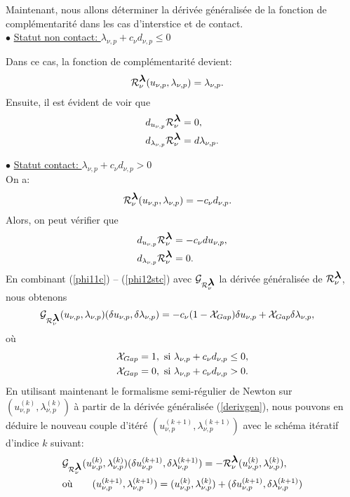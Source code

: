 Maintenant, nous allons déterminer la dérivée généralisée de la fonction de complémentarité dans les cas d'interstice et de contact.\\

$\bullet$ \underline{Statut non contact: $\lambda_{\nu, p}+c_{\nu}d_{\nu,p}\le 0$}

\noindent Dans ce cas, la fonction de complémentarité devient:
\begin{align*}
&{\cal R}_{\nu}^{\mbox{\boldmath{$\lambda$}}}(u_{\nu, p},\lambda_{\nu, p})=\lambda_{\nu, p}.
\end{align*}
Ensuite, il est évident de voir que
\begin{align}
&d_{u_{\nu, p}} {\cal R}_{\nu}^{\mbox{\boldmath{$\lambda$}}}=0\label{phi11c},\\
&d_{\lambda_{\nu, p}} {\cal R}_{\nu}^{\mbox{\boldmath{$\lambda$}}}=d{\lambda_{\nu, p}}\label{phi12c}.
\end{align}

$\bullet$ \underline{Statut contact: $\lambda_{\nu, 
p}+c_{\nu}d_{\nu,p}> 0$}\\
\noindent On a:
\begin{align*}
&{\cal R}_{\nu}^{\mbox{\boldmath{$\lambda$}}}(u_{\nu, p},\lambda_{\nu, p})=-c_{\nu}d_{\nu,p}.
\end{align*}
Alors, on peut vérifier que
\begin{align}
&d_{u_{\nu, p}} {\cal R}_{\nu}^{\mbox{\boldmath{$\lambda$}}}=-c_{\nu}d{u_{\nu, p}}\label{phi11stc},\\
&d_{\lambda_{\nu, p}} {\cal R}_{\nu}^{\mbox{\boldmath{$\lambda$}}}=0\label{phi12stc}.
\end{align}
\noindent En combinant (\ref{phi11c}) -- (\ref{phi12stc}) avec ${\cal G}_{{\cal R}_{\nu}^{\mbox{\boldmath{$\lambda$}}}}$ la dérivée généralisée de ${\cal R}_{\nu}^{\mbox{\boldmath{$\lambda$}}}$, nous obtenons
\begin{align}
&{\cal G}_{{\cal R}_{\nu}^{\mbox{\boldmath{$\lambda$}}}}(u_{\nu, p},\lambda_{\nu, p})(\delta u_{\nu, p},\delta\lambda_{\nu, p})= -c_{\nu}(1-{\cal X}_{Gap})\delta u_{\nu, p} + {\cal X}_{Gap} \delta\lambda_{\nu, p},\label{derivgen}
\end{align}
où 
\begin{align*}
&{\cal X}_{Gap} =1, \ {\rm si}\ \lambda_{\nu, p}+c_{\nu}d_{\nu,p}\le 0,\\
&{\cal X}_{Gap} =0,  \ {\rm si}\ \lambda_{\nu, p}+c_{\nu}d_{\nu,p}> 0.
\end{align*}
En utilisant maintenant le formalisme semi-régulier de Newton sur $(u_{\nu, p}^{(k)},\lambda_{\nu, p}^{(k)})$ à partir de la dérivée généralisée (\ref{derivgen}), nous pouvons en déduire le nouveau couple d'itéré $(u_{\nu, p}^{(k+1)},\lambda_{\nu, p}^{(k+1)})$ avec le schéma itératif d'indice $k$ suivant: 
\begin{align}
&{\cal G}_{{\cal R}_{\nu}^{\mbox{\boldmath{$\lambda$}}}}(u_{\nu, p}^{(k)},\lambda_{\nu, p}^{(k)})(\delta u_{\nu, p}^{(k+1)},\delta\lambda_{\nu, p}^{(k+1)})= - {\cal R}_{\nu}^{\mbox{\boldmath{$\lambda$}}} (u_{\nu, p}^{(k)},\lambda_{\nu, p}^{(k)})\label{phi21c},\\
& \mbox{où} \qquad (u_{\nu, p}^{(k+1)},\lambda_{\nu, p}^{(k+1)}) = (u_{\nu, p}^{(k)},\lambda_{\nu, p}^{(k)}) + (\delta u_{\nu, p}^{(k+1)},\delta \lambda_{\nu, p}^{(k+1)})\label{phi22c}
\end{align}

